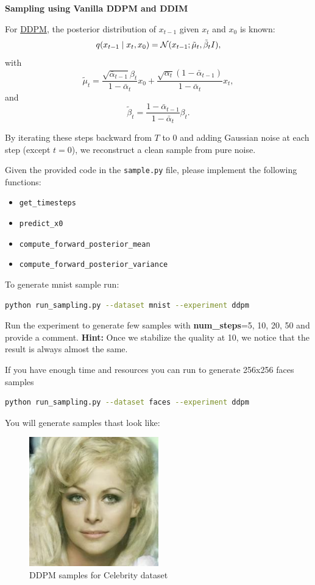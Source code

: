  \textbf{Sampling using Vanilla DDPM and DDIM}

For \href{https://arxiv.org/pdf/2006.11239}{DDPM}, the posterior distribution of $x_{t-1}$ given $x_t$ and $x_0$ is known:
\[
    q(x_{t-1} \mid x_t, x_0) = \mathcal{N}(x_{t-1}; \tilde{\mu}_t, \tilde{\beta}_t I),
\]
with
\[
    \tilde{\mu}_t = \frac{\sqrt{\bar{\alpha}_{t-1}}\beta_t}{1-\bar{\alpha}_t} x_0 
    + \frac{\sqrt{\alpha_t}(1-\bar{\alpha}_{t-1})}{1-\bar{\alpha}_t} x_t,
\]
and
\[
    \tilde{\beta}_t = \frac{1-\bar{\alpha}_{t-1}}{1-\bar{\alpha}_t}\beta_t.
\]

By iterating these steps backward from $T$ to $0$ and adding Gaussian noise at each step (except $t=0$), we reconstruct a clean sample from pure noise.

Given the provided code in the \texttt{sample.py} file, please implement the following functions:

\begin{itemize}
    \item \texttt{get\_timesteps}
    \item \texttt{predict\_x0}
    \item \texttt{compute\_forward\_posterior\_mean}
    \item \texttt{compute\_forward\_posterior\_variance}
\end{itemize}

To generate mnist sample run: 
\begin{lstlisting}[language=bash]
    python run_sampling.py --dataset mnist --experiment ddpm
\end{lstlisting}

Run the experiment to generate few samples with \textbf{num\_steps}=5, 10, 20, 50 and provide a comment. 
\textbf{Hint: }Once we stabilize the quality at 10, we notice that the result is always almost the same.

If you have enough time and resources you can run to generate 256x256 faces samples

\begin{lstlisting}[language=bash]
    python run_sampling.py --dataset faces --experiment ddpm
\end{lstlisting}

You will generate samples thast look like:

\begin{figure}[h]
    \centering
    \includegraphics[width=0.5\textwidth]{./figures/ddpm_steps1000_seed42_img_0}
    \caption{DDPM samples for Celebrity dataset}
\end{figure}

